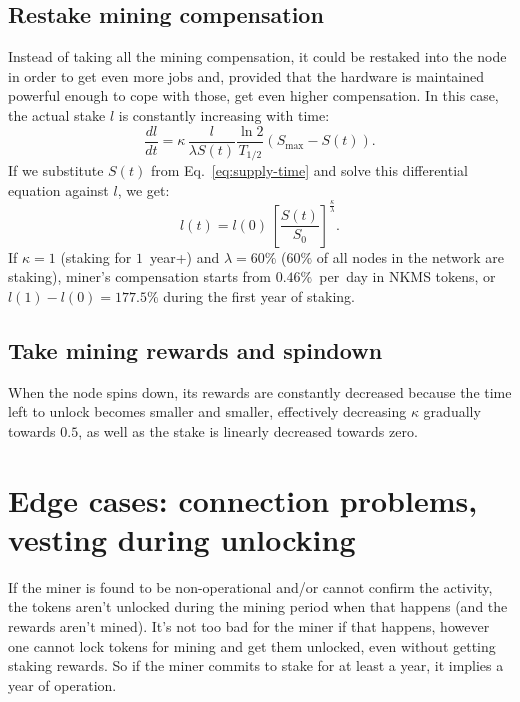 \documentclass[longbibliography,nofootinbib,twocolumn]{revtex4-1}
\begin{document}
\subsection{Restake mining compensation}

Instead of taking all the mining compensation, it could be restaked into the node in order to get even more jobs and, provided that the hardware is maintained
powerful enough to cope with those, get even higher compensation.
In this case, the actual stake $l$ is constantly increasing with time:
\begin{equation}
    \frac{dl}{dt} =  \kappa\, \frac{l}{\lambda S(t)} \frac{\ln{2}}{T_{1/2}} \left( S_{\max} - S(t)\right).
\end{equation}
If we substitute $S(t)$ from Eq.~\ref{eq:supply-time} and solve this differential equation against $l$, we get:
\begin{equation}
    l(t) = l(0)\,\left[ \frac{S(t)}{S_0} \right]^{\frac{\kappa}{\lambda}}.
\end{equation}
If $\kappa=1$ (staking for $1$~year+) and $\lambda=60\%$ ($60\%$ of all nodes in the network are staking),
miner's compensation starts from $0.46\%$~per~day in NKMS tokens,
or $l(1) - l(0) = 177.5\%$ during the first year of staking.

\subsection{Take mining rewards and spindown}

When the node spins down, its rewards are constantly decreased because the time left to unlock becomes smaller and smaller,
effectively decreasing $\kappa$ gradually towards $0.5$,
as well as the stake is linearly decreased towards zero.

\section{Edge cases: connection problems, vesting during unlocking}

If the miner is found to be non-operational and/or cannot confirm the activity, the tokens aren't unlocked during the mining period when that happens (and the
rewards aren't mined).
It's not too bad for the miner if that happens, however one cannot lock tokens for mining and get them unlocked, even without getting staking rewards.
So if the miner commits to stake for at least a year, it implies a year of operation.
\end{document}
